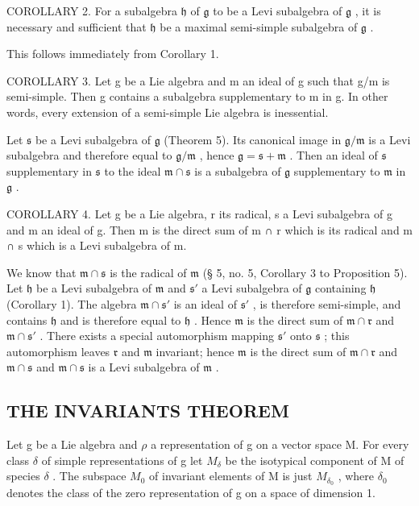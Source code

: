 COROLLARY 2. For a subalgebra \(\mathfrak{h}\) of \(\mathfrak{g}\) to be a Levi subalgebra of \(\mathfrak{g}\) , it is necessary and sufficient that \(\mathfrak{h}\) be a maximal semi-simple subalgebra of \(\mathfrak{g}\) .

This follows immediately from Corollary 1.

COROLLARY 3. Let g be a Lie algebra and m an ideal of g such that g/m is semi-simple. Then g contains a subalgebra supplementary to m in g. In other words, every extension of a semi-simple Lie algebra is inessential.

Let \(\mathfrak{s}\) be a Levi subalgebra of \(\mathfrak{g}\) (Theorem 5). Its canonical image in \(\mathfrak{g}/\mathfrak{m}\) is a Levi subalgebra and therefore equal to \(\mathfrak{g}/\mathfrak{m}\) , hence \(\mathfrak{g} = \mathfrak{s} + \mathfrak{m}\) . Then an ideal of \(\mathfrak{s}\) supplementary in \(\mathfrak{s}\) to the ideal \(\mathfrak{m} \cap \mathfrak{s}\) is a subalgebra of \(\mathfrak{g}\) supplementary to \(\mathfrak{m}\) in \(\mathfrak{g}\) .

COROLLARY 4. Let g be a Lie algebra, r its radical, s a Levi subalgebra of g and m an ideal of g. Then m is the direct sum of m ∩ r which is its radical and m ∩ s which is a Levi subalgebra of m.

We know that \(\mathfrak{m} \cap \mathfrak{s}\) is the radical of \(\mathfrak{m}\) (§ 5, no. 5, Corollary 3 to Proposition 5). Let \(\mathfrak{h}\) be a Levi subalgebra of \(\mathfrak{m}\) and \(\mathfrak{s}'\) a Levi subalgebra of \(\mathfrak{g}\) containing \(\mathfrak{h}\) (Corollary 1). The algebra \(\mathfrak{m} \cap \mathfrak{s}'\) is an ideal of \(\mathfrak{s}'\) , is therefore semi-simple, and contains \(\mathfrak{h}\) and is therefore equal to \(\mathfrak{h}\) . Hence \(\mathfrak{m}\) is the direct sum of \(\mathfrak{m} \cap \mathfrak{r}\) and \(\mathfrak{m} \cap \mathfrak{s}'\) . There exists a special automorphism mapping \(\mathfrak{s}'\) onto \(\mathfrak{s}\) ; this automorphism leaves \(\mathfrak{r}\) and \(\mathfrak{m}\) invariant; hence \(\mathfrak{m}\) is the direct sum of \(\mathfrak{m} \cap \mathfrak{r}\) and \(\mathfrak{m} \cap \mathfrak{s}\) and \(\mathfrak{m} \cap \mathfrak{s}\) is a Levi subalgebra of \(\mathfrak{m}\) .

\subsection{THE INVARIANTS THEOREM}

Let g be a Lie algebra and \(\rho\) a representation of g on a vector space M. For every class \(\delta\) of simple representations of g let \(M_{\delta}\) be the isotypical component of M of species \(\delta\) . The subspace \(M_{0}\) of invariant elements of M is just \(M_{\delta_{0}}\) , where \(\delta_{0}\) denotes the class of the zero representation of g on a space of dimension 1.

